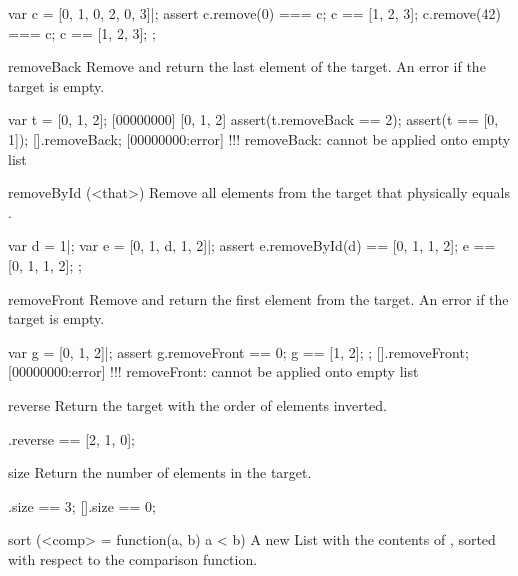 \begin{urbiscriptapi}
\begin{urbiscript}
var c = [0, 1, 0, 2, 0, 3]|;
assert
{
  c.remove(0) === c;   c ==  [1, 2, 3];
  c.remove(42) === c;  c ==  [1, 2, 3];
};
\end{urbiscript}

\item[removeBack]
  Remove and return the last element of the target. An error if the
  target is empty.

\begin{urbiscript}
var t = [0, 1, 2];
[00000000] [0, 1, 2]
assert(t.removeBack == 2);
assert(t == [0, 1]);
[].removeBack;
[00000000:error] !!! removeBack: cannot be applied onto empty list
\end{urbiscript}

\item[removeById](<that>)%
  Remove all elements from the target that physically equals
  .

\begin{urbiscript}
var d = 1|;
var e = [0, 1, d, 1, 2]|;
assert
{
  e.removeById(d) == [0, 1, 1, 2];
  e == [0, 1, 1, 2];
};
\end{urbiscript}

\item[removeFront]
Remove and return the first element from the target. An error if the
target is empty.

\begin{urbiscript}
var g = [0, 1, 2]|;
assert
{
  g.removeFront == 0;
  g == [1, 2];
};
[].removeFront;
[00000000:error] !!! removeFront: cannot be applied onto empty list
\end{urbiscript}

\item[reverse]
Return the target with the order of elements inverted.

\begin{urbiassert}
[0, 1, 2].reverse == [2, 1, 0];
\end{urbiassert}

\item[size]
Return the number of elements in the target.

\begin{urbiassert}
[0, 1, 2].size == 3;
[].size == 0;
\end{urbiassert}

\item[sort](<comp> = function(a, b) {a < b})%
  A new List with the contents of \this, sorted with respect to the
   comparison function.


\end{urbiscriptapi}
